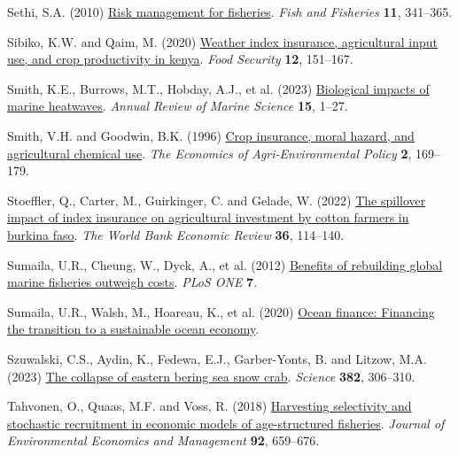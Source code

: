 \documentclass[
  letterpaper,
  DIV=11,
  numbers=noendperiod]{scrartcl}
\newlength{\cslhangindent}
\newlength{\cslentryspacingunit} %
\newenvironment{CSLReferences}[2] %
 {%
  \setlength{\parindent}{0pt}
  \ifodd #1
  \let\oldpar\par
  \def\par{\hangindent=\cslhangindent\oldpar}
  \fi
  \setlength{\parskip}{#2\cslentryspacingunit}
 }%
 {}
\theoremstyle{plain}
\theoremstyle{plain}
\theoremstyle{remark}
\begin{document}
\begin{CSLReferences}{1}{0}
\leavevmode{}%
Sethi, S.A. (2010)
\href{https://doi.org/10.1111/j.1467-2979.2010.00363.x}{Risk management
for fisheries}. \emph{Fish and Fisheries} \textbf{11}, 341--365.

\leavevmode{}%
Sibiko, K.W. and Qaim, M. (2020)
\href{https://doi.org/10.1007/s12571-019-00987-y}{Weather index
insurance, agricultural input use, and crop productivity in kenya}.
\emph{Food Security} \textbf{12}, 151--167.

\leavevmode{}%
Smith, K.E., Burrows, M.T., Hobday, A.J., et al. (2023)
\href{https://doi.org/10.1146/annurev-marine-032122-121437}{Biological
impacts of marine heatwaves}. \emph{Annual Review of Marine Science}
\textbf{15}, 1--27.

\leavevmode{}%
Smith, V.H. and Goodwin, B.K. (1996)
\href{https://doi.org/10.2307/1243714}{Crop insurance, moral hazard, and
agricultural chemical use}. \emph{The Economics of Agri-Environmental
Policy} \textbf{2}, 169--179.

\leavevmode{}%
Stoeffler, Q., Carter, M., Guirkinger, C. and Gelade, W. (2022)
\href{https://doi.org/10.1093/wber}{The spillover impact of index
insurance on agricultural investment by cotton farmers in burkina faso}.
\emph{The World Bank Economic Review} \textbf{36}, 114--140.

\leavevmode{}%
Sumaila, U.R., Cheung, W., Dyck, A., et al. (2012)
\href{https://doi.org/10.1371/journal.pone.0040542}{Benefits of
rebuilding global marine fisheries outweigh costs}. \emph{PLoS ONE}
\textbf{7}.

\leavevmode{}%
Sumaila, U.R., Walsh, M., Hoareau, K., et al. (2020)
\href{https://www.oceanpanel.org/blue-}{Ocean finance: Financing the
transition to a sustainable ocean economy}.

\leavevmode{}%
Szuwalski, C.S., Aydin, K., Fedewa, E.J., Garber-Yonts, B. and Litzow,
M.A. (2023) \href{https://doi.org/10.1126/SCIENCE.ADF6035}{The collapse
of eastern bering sea snow crab}. \emph{Science} \textbf{382}, 306--310.

\leavevmode{}%
Tahvonen, O., Quaas, M.F. and Voss, R. (2018)
\href{https://doi.org/10.1016/j.jeem.2017.08.011}{Harvesting selectivity
and stochastic recruitment in economic models of age-structured
fisheries}. \emph{Journal of Environmental Economics and Management}
\textbf{92}, 659--676.


\end{CSLReferences}
\end{document}
